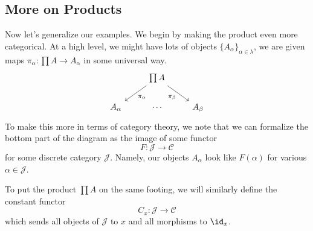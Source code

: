 \documentclass[../notes.tex]{subfiles}
\begin{document}
\subsection{More on Products}
Now let's generalize our examples. We begin by making the product even more categorical. At a high level, we might have lots of objects $\{A_\alpha\}_{\alpha\in\lambda}$, we are given maps $\pi_\alpha:\prod A\to A_\alpha$ in some universal way.
\[\begin{tikzcd}
	& {\prod A} \\
	{A_\alpha} & \cdots & {A_\beta}
	\arrow["{\pi_\alpha}", from=1-2, to=2-1]
	\arrow["{\pi_\beta}"', from=1-2, to=2-3]
\end{tikzcd}\]
To make this more in terms of category theory, we note that we can formalize the bottom part of the diagram as the image of some functor
\[F:\mathcal J\to\mathcal C\]
for some discrete category $\mathcal J$. Namely, our objects $A_\alpha$ look like $F(\alpha)$ for various $\alpha\in\mathcal J$.

To put the product $\prod A$ on the same footing, we will similarly define the constant functor
\[C_x:\mathcal J\to\mathcal C\]
which sends all objects of $\mathcal J$ to $x$ and all morphisms to $\id_x$.
\end{document}
